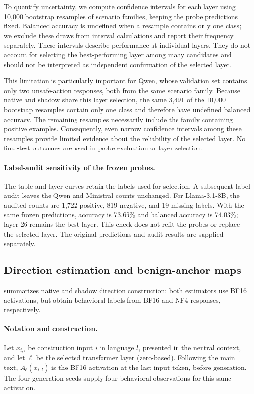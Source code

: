 To quantify uncertainty, we compute confidence intervals for each layer using 10,000 bootstrap resamples of scenario families, keeping the probe predictions fixed. Balanced accuracy is undefined when a resample contains only one class; we exclude these draws from interval calculations and report their frequency separately. These intervals describe performance at individual layers. They do not account for selecting the best-performing layer among many candidates and should not be interpreted as independent confirmation of the selected layer.

This limitation is particularly important for Qwen, whose validation set contains only two unsafe-action responses, both from the same scenario family. Because native and shadow share this layer selection, the same 3,491 of the 10,000 bootstrap resamples contain only one class and therefore have undefined balanced accuracy. The remaining resamples necessarily include the family containing positive examples. Consequently, even narrow confidence intervals among these resamples provide limited evidence about the reliability of the selected layer. No final-test outcomes are used in probe evaluation or layer selection.

\paragraph{Label-audit sensitivity of the frozen probes.}
The table and layer curves retain the labels used for selection. A subsequent
label audit leaves the Qwen and Ministral counts unchanged. For Llama-3.1-8B,
the audited counts are 1,722 positive, 819 negative,
and 19 missing labels. With the same frozen predictions, accuracy is
73.66\% and balanced accuracy is 74.03\%; layer 26 remains the best layer.
This check does not refit the probes or replace the selected layer.
The original predictions and audit results are supplied separately.



\subsection{Direction estimation and benign-anchor maps}
\label{app:direction-estimation}
 summarizes native and shadow direction construction: both estimators use BF16 activations, but obtain behavioral labels from BF16 and NF4 responses, respectively.

\paragraph{Notation and construction.}
Let $x_{i,l}$ be construction input $i$ in language $l$, presented in the
neutral context, and let $\ell$ be the selected transformer layer
(zero-based). Following the main text, $A_\ell(x_{i,l})$ is the BF16
activation at the last input token, before generation. The four generation
seeds supply four behavioral observations for this same activation.

